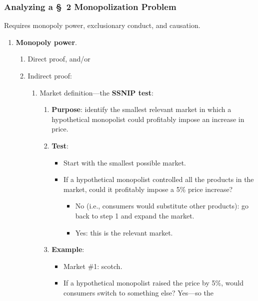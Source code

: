 \subsubsection{Analyzing a \S\ 2 Monopolization Problem}

Requires monopoly power, exclusionary conduct, and causation.

\begin{enumerate}
    \item \textbf{Monopoly power}.
    \begin{enumerate}
        \item Direct proof, and/or
        \item Indirect proof:
        \begin{enumerate}
            \item Market definition---the \textbf{SSNIP test}:
            \begin{enumerate}
                \item \textbf{Purpose}: identify the smallest relevant market 
                in which a hypothetical monopolist could profitably impose an 
                increase in price.
                \item \textbf{Test}:
                \begin{itemize}
                    \item Start with the smallest possible market.
                    \item If a hypothetical monopolist controlled all the 
                    products in the market, could it profitably impose a 5\% 
                    price increase?
                    \begin{itemize}
                        \item No (i.e., consumers would substitute other 
                        products): go back to step 1 and expand the market.  
                        \item Yes: this is the relevant market.
                    \end{itemize}
                \end{itemize}
                \item \textbf{Example}:
                \begin{itemize}
                    \item Market \#1: scotch.
                    \item If a hypothetical monopolist raised the price by 5\%, 
                    would consumers switch to something else? Yes—so the 

\end{itemize}
\end{enumerate}
\end{enumerate}
\end{enumerate}
\end{enumerate}
